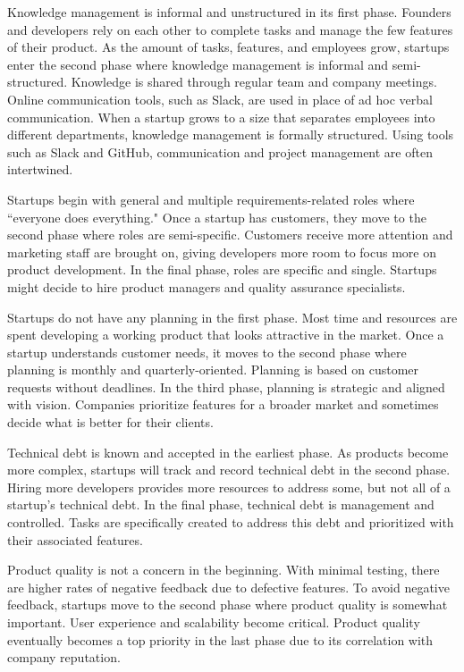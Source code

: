 \documentclass{sig-alternate}
\begin{document}
Knowledge management is informal and unstructured in its first phase. Founders and developers rely on each other to complete tasks and manage the few features of their product. As the amount of tasks, features, and employees grow, startups enter the second phase where knowledge management is informal and semi-structured. Knowledge is shared through regular team and company meetings. Online communication tools, such as Slack, are used in place of ad hoc verbal communication. When a startup grows to a size that separates employees into different departments, knowledge management is formally structured. Using tools such as Slack and GitHub, communication and project management are often intertwined.

Startups begin with general and multiple requirements-related roles where ``everyone does everything." Once a startup has customers, they move to the second phase where roles are semi-specific. Customers receive more attention and marketing staff are brought on, giving developers more room to focus more on product development. In the final phase, roles are specific and single. Startups might decide to hire product managers and quality assurance specialists.

Startups do not have any planning in the first phase. Most time and resources are spent developing a working product that looks attractive in the market. Once a startup understands customer needs, it moves to the second phase where planning is monthly and quarterly-oriented. Planning is based on customer requests without deadlines. In the third phase, planning is strategic and aligned with vision. Companies prioritize features for a broader market and sometimes decide what is better for their clients.

Technical debt is known and accepted in the earliest phase. As products become more complex, startups will track and record technical debt in the second phase. Hiring more developers provides more resources to address some, but not all of a startup's technical debt. In the final phase, technical debt is management and controlled. Tasks are specifically created to address this debt and prioritized with their associated features.

Product quality is not a concern in the beginning. With minimal testing, there are higher rates of negative feedback due to defective features. To avoid negative feedback, startups move to the second phase where product quality is somewhat important. User experience and scalability become critical. Product quality eventually becomes a top priority in the last phase due to its correlation with company reputation.
\end{document}
